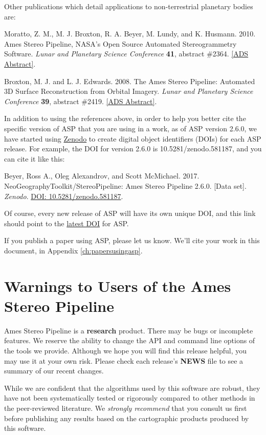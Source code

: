Other publications which detail applications to non-terrestrial planetary bodies are:

\begin{description}
\item Moratto, Z. M., M. J. Broxton, R. A. Beyer, M. Lundy, and K. Husmann.
2010. Ames Stereo Pipeline, NASA's Open Source Automated Stereogrammetry
Software. \textit{Lunar and Planetary Science Conference} \textbf{41},
abstract \#2364.
\href{http://adsabs.harvard.edu/abs/2010LPI....41.2364M}{[ADS Abstract]}.

\item Broxton, M. J. and L. J. Edwards. 2008. The Ames Stereo Pipeline:
Automated 3D Surface Reconstruction from Orbital Imagery. \textit{Lunar
and Planetary Science Conference} \textbf{39}, abstract \#2419.
\href{http://adsabs.harvard.edu/abs/2008LPI....39.2419B}{[ADS Abstract]}.
\end{description}

In addition to using the references above, in order to help you
better cite the specific version of ASP that you are using in a work, as of ASP version 2.6.0,
we have started using \href{https://zenodo.org}{Zenodo} to create digital object identifiers (DOIs)
for each ASP release.  For example, the DOI for version 2.6.0 is 10.5281/zenodo.581187, and you can
cite it like this:

\begin{description}
		\item Beyer, Ross A., Oleg Alexandrov, and Scott McMichael. 2017. NeoGeographyToolkit/StereoPipeline: Ames Stereo Pipeline 2.6.0. [Data set]. \textit{Zenodo}. \href{http://doi.org/10.5281/zenodo.581187}{DOI: 10.5281/zenodo.581187}.
\end{description}

Of course, every new release of ASP will have its own unique DOI,
and this link should point to the
\href{https://zenodo.org/badge/latestdoi/714891}{latest DOI} for
ASP.

If you publish a paper using ASP, please let us know. We'll cite your
work in this document, in Appendix \ref{ch:papersusingasp}.

\section{Warnings to Users of the Ames Stereo Pipeline}

Ames Stereo Pipeline is a {\bf research} product. There may be bugs or
incomplete features. We reserve the ability to change the API and
command line options of the tools we provide. Although we hope you will
find this release helpful, you may use it at your own risk. Please check
each release's {\bf NEWS} file to see a summary of our recent changes.

While we are confident that the algorithms used by this software are
robust, they have not been systematically tested or rigorously
compared to other methods in the peer-reviewed literature. We {\it
strongly recommend} that you consult us first before publishing
any results based on the cartographic products produced by this software.
